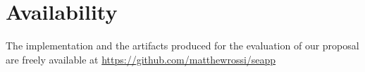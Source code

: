 











\section*{Availability}
The implementation and the artifacts produced for the evaluation of
our proposal are freely available at
\url{https://github.com/matthewrossi/seapp}

